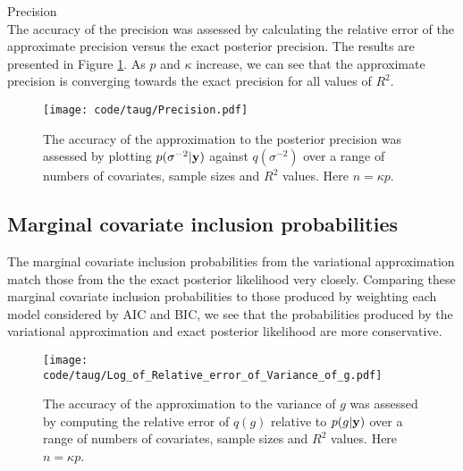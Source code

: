\documentclass{amsart}[12pt]
\begin{document}
Precision \\

The accuracy of the precision was assessed by calculating the relative error of the approximate precision
versus the exact posterior precision. The results are presented in Figure \ref{fig:precision}. As $p$ and
$\kappa$ increase, we can see that the approximate precision is converging towards the exact precision for all
values of $R^2$.

\begin{figure}[p]
	\texttt{[image: code/taug/Precision.pdf]}
	\caption{The accuracy of the approximation to the posterior precision was assessed by plotting
						$p(\sigma^{-2} | {\bf y})$ against $q(\sigma^{-2})$ over a range
	of numbers of covariates, sample sizes and $R^2$  values. Here $n = \kappa p$.}
	\label{fig:precision}
\end{figure}

\subsection{Marginal covariate inclusion probabilities}

The marginal covariate inclusion probabilities from the variational approximation match those from the the
exact posterior likelihood very closely. Comparing these marginal covariate inclusion probabilities to those
produced by weighting each model considered by AIC and BIC, we see that the probabilities produced by the
variational approximation and exact posterior likelihood are more conservative.

\begin{figure}[p]
	\texttt{[image: code/taug/Log\_of\_Relative\_error\_of\_Variance\_of\_g.pdf]}
	\caption{The accuracy of the approximation to the variance of $g$ was assessed by computing the relative
						error of $q(g)$ relative to $p(g | {\bf y})$ over a range
	of numbers of covariates, sample sizes and $R^2$  values. Here $n = \kappa p$.}
	\label{fig:rel_error_var_g}
\end{figure}



\end{document}
